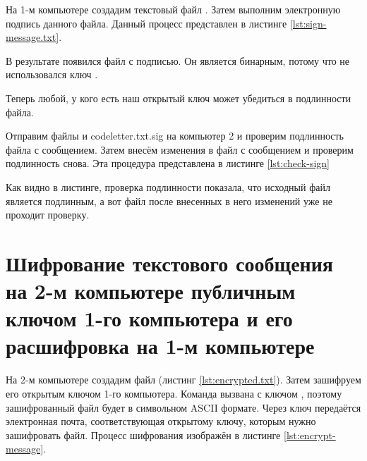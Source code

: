 На 1-м компьютере создадим текстовый файл . Затем выполним электронную подпись данного файла. Данный процесс представлен в листинге \ref{lst:sign-message.txt}.





В результате появился файл  с подписью. Он является бинарным, потому что не использовался ключ .

Теперь любой, у кого есть наш открытый ключ может убедиться в подлинности файла.

Отправим файлы  и code{letter.txt.sig} на компьютер 2 и проверим подлинность файла с сообщением. Затем внесём изменения в файл с сообщением и проверим подлинность снова. Эта процедура представлена в листинге \ref{lst:check-sign}



Как видно в листинге, проверка подлинности показала, что исходный файл является подлинным, а вот файл после внесенных в него изменений уже не проходит проверку.

\section{Шифрование текстового сообщения на 2-м компьютере публичным ключом 1-го компьютера и его расшифровка на 1-м компьютере}

На 2-м компьютере создадим файл  (листинг \ref{lst:encrypted.txt}). Затем зашифруем его открытым ключом 1-го компьютера. Команда вызвана с ключом , поэтому зашифрованный файл будет в символьном ASCII формате. Через ключ  передаётся электронная почта, соответствующая открытому ключу, которым нужно зашифровать файл. Процесс шифрования изображён в листинге \ref{lst:encrypt-message}.



